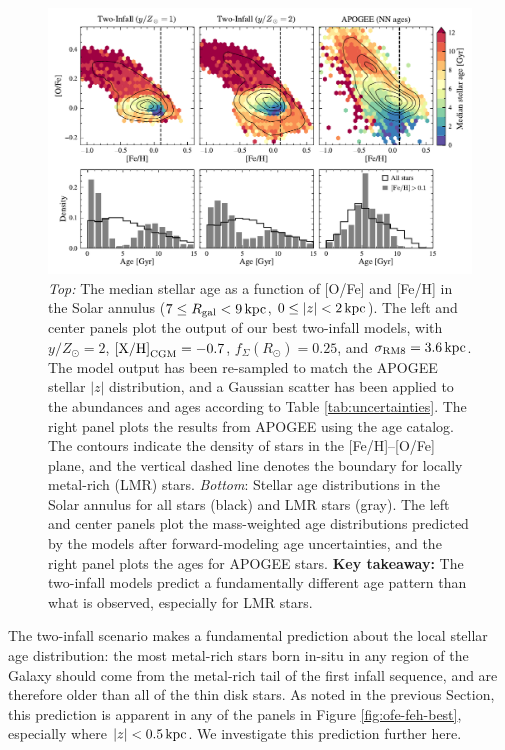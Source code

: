 \documentclass[twocolumn,twocolappendix,linenumbers]{aastex631}
\newcommand{\yZ}[1]{$y/Z_\odot=#1$}
\newcommand{\kpc}{\,{\rm kpc}}
\begin{document}
\begin{figure}
    \centering
    \includegraphics[width=\textwidth]{figures/lmr_ages.pdf}
    \caption{{\it Top:} The median stellar age as a function of [O/Fe] and [Fe/H] in the Solar annulus ($7\leq R_{\rm gal}<9\kpc$, $0\leq|z|<2\kpc$). The left and center panels plot the output of our best two-infall models, with \yZ{2}, ${\rm [X/H]}_{\rm CGM}=-0.7$, $f_\Sigma(R_\odot)=0.25$, and $\sigma_{\rm RM8}=3.6\kpc$. The model output has been re-sampled to match the APOGEE stellar $|z|$ distribution, and a Gaussian scatter has been applied to the abundances and ages according to Table \ref{tab:uncertainties}. The right panel plots the results from APOGEE using the \citet{leung_variational_2023} age catalog. The contours indicate the density of stars in the [Fe/H]--[O/Fe] plane, and the vertical dashed line denotes the boundary for locally metal-rich (LMR) stars.
    {\it Bottom}: Stellar age distributions in the Solar annulus for all stars (black) and LMR stars (gray). The left and center panels plot the mass-weighted age distributions predicted by the models after forward-modeling age uncertainties, and the right panel plots the \citet{leung_variational_2023} ages for APOGEE stars.
    {\bf Key takeaway:} The two-infall models predict a fundamentally different age pattern than what is observed, especially for LMR stars.}
    \label{fig:lmr-ages}
\end{figure}

The two-infall scenario makes a fundamental prediction about the local stellar age distribution: the most metal-rich stars born in-situ in any region of the Galaxy should come from the metal-rich tail of the first infall sequence, and are therefore older than all of the thin disk stars. As noted in the previous Section, this prediction is apparent in any of the panels in Figure \ref{fig:ofe-feh-best}, especially where $|z|<0.5\kpc$. We investigate this prediction further here.
\end{document}
